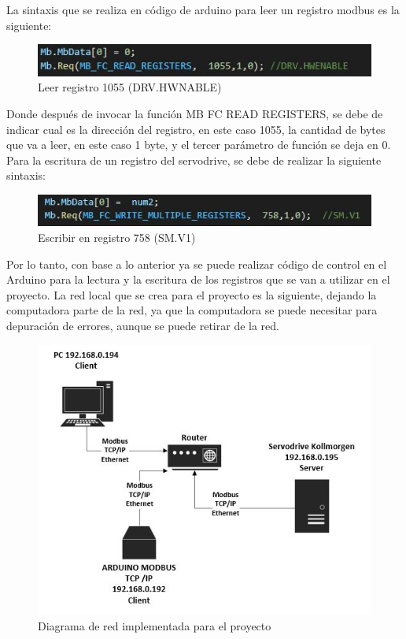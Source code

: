\documentclass[12pt,titlepage]{article}
\begin{document}
La sintaxis que se realiza en código de arduino para leer un registro modbus es la siguiente: \\
 \begin{figure}[htbp]
\hspace*{4.1cm} 
\includegraphics[scale=0.68]{read_register}
\caption{Leer registro 1055 (DRV.HWNABLE)}
\end{figure}

Donde después de invocar la función MB FC READ REGISTERS, se debe de indicar cual es la dirección del registro, en este caso 1055, la cantidad de bytes que va a leer, en este caso 1 byte, y el tercer parámetro de función se deja en 0. \\ 

Para la escritura de un registro del servodrive, se debe de realizar la siguiente sintaxis: \\ 
 \begin{figure}[htbp]
\hspace*{4.1cm} 
\includegraphics[scale=0.68]{write_reg}
\caption{Escribir en registro 758 (SM.V1)}
\end{figure}
\newpage
Por lo tanto, con base a lo anterior ya se puede realizar código de control en el Arduino para la lectura y la escritura de los registros que se van a utilizar en el proyecto. La red local que se crea para el proyecto es la siguiente, dejando la computadora parte de la red, ya que la computadora se puede necesitar para depuración de errores, aunque se puede retirar de la red. \\ 

 \begin{figure}[htbp]
\hspace*{3.9cm} 
\includegraphics[scale=0.68]{red_diagram}
\caption{Diagrama de red implementada para el proyecto}
\end{figure}
\end{document}
